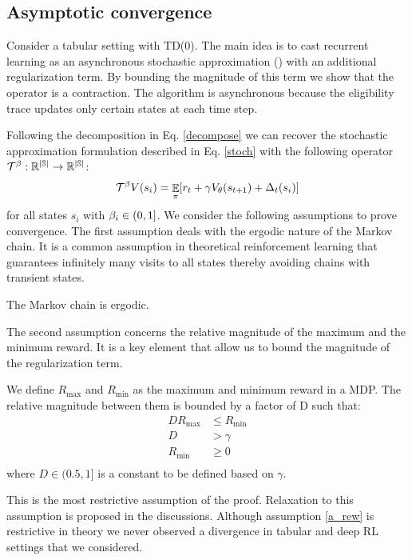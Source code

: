 \subsection{Asymptotic convergence}
Consider a tabular setting with TD(0). The main idea is to cast recurrent learning as an asynchronous stochastic approximation (\cite{tsitsiklis1994asynchronous}) with an additional regularization term. By bounding the magnitude of this term we show that the operator is a contraction. The algorithm is asynchronous because the eligibility trace updates only certain states at each time step.

Following the decomposition in Eq. \ref{decompose} we can recover the stochastic approximation formulation described in Eq. \ref{stoch} with the following operator $\mathcal{T}^{\beta}: \mathbb{R^{|\mathbb{S}|}} \rightarrow \mathbb{R^{|\mathbb{S}|}}$:
\begin{equation}
    \mathcal{T}^{\beta} V(s_i) = \mathop{\mathbb{E}}_{\pi}[r_t + \gamma V_{\theta}(s_{t+1}) + \Delta_t(s_i)]
\end{equation}
for all states $s_i$ with $\beta_i \in (0,1]$.
We consider the following assumptions to prove convergence.
The first assumption deals with the ergodic nature of the Markov chain. It is a common assumption in theoretical reinforcement learning that guarantees infinitely many visits to all states thereby avoiding chains with transient states.
\begin{assumption}
The Markov chain is ergodic.
\end{assumption}
The second assumption concerns the relative magnitude of the maximum and the minimum reward. It is a key element that allow us to bound the magnitude of the regularization term. 
\begin{assumption}
\label{a_rew}
We define $R_{\max}$ and $R_{\min}$ as the maximum and minimum reward in a MDP. The relative magnitude between them is bounded by a factor of D such that:
\begin{equation}
\begin{split}
    DR_{\text{max}}  &\leq R_{\text{min}}  \\
    D &> \gamma \\
    R_{\text{min}} &\geq 0\\
\end{split}
\end{equation}
where $D \in (0.5,1]$ is a constant to be defined based on $\gamma$.
\end{assumption}
This is the most restrictive assumption of the proof. Relaxation to this assumption is proposed in the discussions. Although assumption \ref{a_rew} is restrictive in theory we never observed a divergence in tabular and deep RL settings that we considered.

